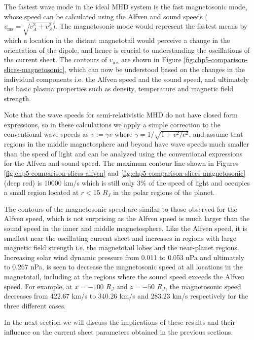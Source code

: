 The fastest wave mode in the ideal MHD system is the fast magnetosonic mode, whose speed can be calculated using the Alfven and sound speeds ($v_\text{ms} = \sqrt{v_A^2 + v_S^2}$). The magnetosonic mode would represent the fastest means by which a location in the distant magnetotail would perceive a change in the orientation of the dipole, and hence is crucial to understanding the oscillations of the current sheet. The contours of $v_\text{ms}$ are shown in Figure \ref{fig:chp5-comparison-slices-magnetosonic}, which can now be understood based on the changes in the individual components i.e. the Alfven speed and the sound speed, and ultimately the basic plasma properties such as density, temperature and magnetic field strength. 

Note that the wave speeds for semi-relativistic MHD do not have closed form expressions, so in these calculations we apply a simple correction to the conventional wave speeds as $v := \gamma v$ where $\gamma = 1/\sqrt{1+v^2/c^2}$, and assume that regions in the middle magnetosphere and beyond have wave speeds much smaller than the speed of light and can be analyzed using the conventional expressions for the Alfven and sound speed. The maximum contour line shown in Figures \ref{fig:chp5-comparison-slices-alfven} and \ref{fig:chp5-comparison-slices-magnetosonic} (deep red) is 10000 km/s which is still only 3\% of the speed of light and occupies a small region located at $r < 15$ $R_J$ in the polar regions of the planet. 

The contours of the magnetosonic speed are similar to those observed for the Alfven speed, which is not surprising as the Alfven speed is much larger than the sound speed in the inner and middle magnetosphere. Like the Alfven speed, it is smallest near the oscillating current sheet and increases in regions with large magnetic field strength i.e. the magnetotail lobes and the near-planet regions. Increasing solar wind dynamic pressure from 0.011 to 0.053 nPa and ultimately to 0.267 nPa, is seen to decrease the magnetosonic speed at all locations in the magnetotail, including at the regions where the sound speed exceeds the Alfven speed. For example, at $x=-100$ $R_J$ and $z=-50$ $R_J$, the magnetosonic speed decreases from $422.67$ km/s to $340.26$ km/s and $283.23$ km/s respectively for the three different cases. 

In the next section we will discuss the implications of these results and their influence on the current sheet parameters obtained in the previous sections. 

